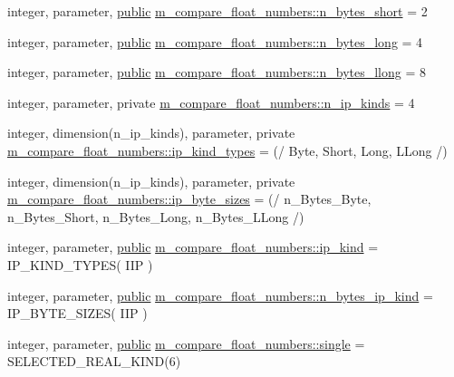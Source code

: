 \begin{DoxyCompactItemize}
\item 
integer, parameter, \hyperlink{M__stopwatch_83_8txt_a2f74811300c361e53b430611a7d1769f}{public} \hyperlink{namespacem__compare__float__numbers_acff1ac867eea95e76e28f083be5bddcc}{m\+\_\+compare\+\_\+float\+\_\+numbers\+::n\+\_\+bytes\+\_\+short} = 2
\item 
integer, parameter, \hyperlink{M__stopwatch_83_8txt_a2f74811300c361e53b430611a7d1769f}{public} \hyperlink{namespacem__compare__float__numbers_a6295d4185db12b4e3d14c67de6164dd4}{m\+\_\+compare\+\_\+float\+\_\+numbers\+::n\+\_\+bytes\+\_\+long} = 4
\item 
integer, parameter, \hyperlink{M__stopwatch_83_8txt_a2f74811300c361e53b430611a7d1769f}{public} \hyperlink{namespacem__compare__float__numbers_a2c4b39b521fa4fe5ea36044ddbbbb2ba}{m\+\_\+compare\+\_\+float\+\_\+numbers\+::n\+\_\+bytes\+\_\+llong} = 8
\item 
integer, parameter, private \hyperlink{namespacem__compare__float__numbers_a6cbe22bf2f7aa1ada923de776f8258bf}{m\+\_\+compare\+\_\+float\+\_\+numbers\+::n\+\_\+ip\+\_\+kinds} = 4
\item 
integer, dimension(n\+\_\+ip\+\_\+kinds), parameter, private \hyperlink{namespacem__compare__float__numbers_a18a2ec0b5b6a904a6ccd63fad576f759}{m\+\_\+compare\+\_\+float\+\_\+numbers\+::ip\+\_\+kind\+\_\+types} = (/ Byte, Short, Long, L\+Long /)
\item 
integer, dimension(n\+\_\+ip\+\_\+kinds), parameter, private \hyperlink{namespacem__compare__float__numbers_aee1b5dea82ea1e760308976a08df6356}{m\+\_\+compare\+\_\+float\+\_\+numbers\+::ip\+\_\+byte\+\_\+sizes} = (/ n\+\_\+\+Bytes\+\_\+\+Byte, n\+\_\+\+Bytes\+\_\+\+Short, n\+\_\+\+Bytes\+\_\+\+Long, n\+\_\+\+Bytes\+\_\+\+L\+Long /)
\item 
integer, parameter, \hyperlink{M__stopwatch_83_8txt_a2f74811300c361e53b430611a7d1769f}{public} \hyperlink{namespacem__compare__float__numbers_a932ca5131dba16f9e2d30e75cf79b574}{m\+\_\+compare\+\_\+float\+\_\+numbers\+::ip\+\_\+kind} = I\+P\+\_\+\+K\+I\+N\+D\+\_\+\+T\+Y\+P\+ES( I\+IP )
\item 
integer, parameter, \hyperlink{M__stopwatch_83_8txt_a2f74811300c361e53b430611a7d1769f}{public} \hyperlink{namespacem__compare__float__numbers_a868bf02722b9070cff22ba7803aeffed}{m\+\_\+compare\+\_\+float\+\_\+numbers\+::n\+\_\+bytes\+\_\+ip\+\_\+kind} = I\+P\+\_\+\+B\+Y\+T\+E\+\_\+\+S\+I\+Z\+ES( I\+IP )
\item 
integer, parameter, \hyperlink{M__stopwatch_83_8txt_a2f74811300c361e53b430611a7d1769f}{public} \hyperlink{namespacem__compare__float__numbers_a5f122d46d6ad7d1cf0b899d9c855c498}{m\+\_\+compare\+\_\+float\+\_\+numbers\+::single} = S\+E\+L\+E\+C\+T\+E\+D\+\_\+\+R\+E\+A\+L\+\_\+\+K\+I\+ND(6)

\end{DoxyCompactItemize}
